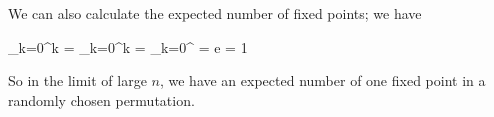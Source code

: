 We can also calculate the expected number of fixed points; we have

\bee
\sum_{k=0}^\infty k  =  \sum_{k=0}^\infty k  =  \sum_{k=0}^\infty {} =  e = 1
\eee

So in the limit of large $n$, we have an expected number of one fixed point in a randomly chosen permutation.


